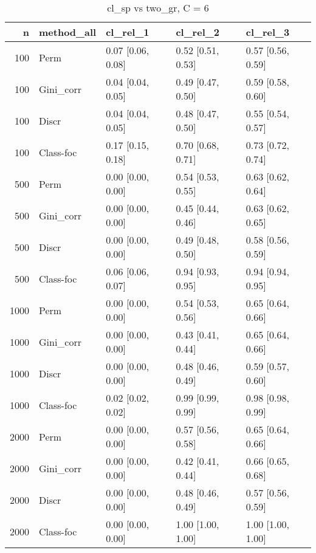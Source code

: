 \begin{table}[ht]
\centering
\caption{cl\_sp vs two\_gr, C = 6} 
\begin{tabular}{rllll}
  \hline
n & method\_all & cl\_rel\_1 & cl\_rel\_2 & cl\_rel\_3 \\ 
  \hline
100 & Perm & 0.07 [0.06, 0.08] & 0.52 [0.51, 0.53] & 0.57 [0.56, 0.59] \\ 
  100 & Gini\_corr & 0.04 [0.04, 0.05] & 0.49 [0.47, 0.50] & 0.59 [0.58, 0.60] \\ 
  100 & Discr & 0.04 [0.04, 0.05] & 0.48 [0.47, 0.50] & 0.55 [0.54, 0.57] \\ 
  100 & Class-foc & 0.17 [0.15, 0.18] & 0.70 [0.68, 0.71] & 0.73 [0.72, 0.74] \\ 
   \hline 500 & Perm & 0.00 [0.00, 0.00] & 0.54 [0.53, 0.55] & 0.63 [0.62, 0.64] \\ 
  500 & Gini\_corr & 0.00 [0.00, 0.00] & 0.45 [0.44, 0.46] & 0.63 [0.62, 0.65] \\ 
  500 & Discr & 0.00 [0.00, 0.00] & 0.49 [0.48, 0.50] & 0.58 [0.56, 0.59] \\ 
  500 & Class-foc & 0.06 [0.06, 0.07] & 0.94 [0.93, 0.95] & 0.94 [0.94, 0.95] \\ 
   \hline 1000 & Perm & 0.00 [0.00, 0.00] & 0.54 [0.53, 0.56] & 0.65 [0.64, 0.66] \\ 
  1000 & Gini\_corr & 0.00 [0.00, 0.00] & 0.43 [0.41, 0.44] & 0.65 [0.64, 0.66] \\ 
  1000 & Discr & 0.00 [0.00, 0.00] & 0.48 [0.46, 0.49] & 0.59 [0.57, 0.60] \\ 
  1000 & Class-foc & 0.02 [0.02, 0.02] & 0.99 [0.99, 0.99] & 0.98 [0.98, 0.99] \\ 
   \hline 2000 & Perm & 0.00 [0.00, 0.00] & 0.57 [0.56, 0.58] & 0.65 [0.64, 0.66] \\ 
  2000 & Gini\_corr & 0.00 [0.00, 0.00] & 0.42 [0.41, 0.44] & 0.66 [0.65, 0.68] \\ 
  2000 & Discr & 0.00 [0.00, 0.00] & 0.48 [0.46, 0.49] & 0.57 [0.56, 0.59] \\ 
  2000 & Class-foc & 0.00 [0.00, 0.00] & 1.00 [1.00, 1.00] & 1.00 [1.00, 1.00] \\ 
   \hline
\end{tabular}
\end{table}
